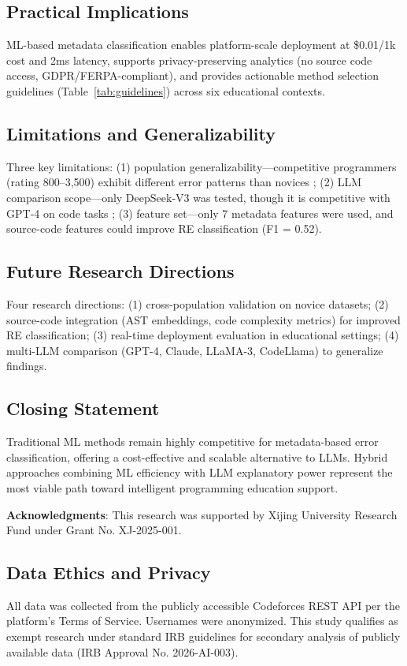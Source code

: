 \documentclass[10pt,a4paper]{article}
\begin{document}
\subsection*{Practical Implications}
ML-based metadata classification enables platform-scale deployment at \$0.01/1k cost and 2ms latency, supports privacy-preserving analytics (no source code access, GDPR/FERPA-compliant), and provides actionable method selection guidelines (Table~\ref{tab:guidelines}) across six educational contexts.

\subsection*{Limitations and Generalizability}
Three key limitations: (1) population generalizability---competitive programmers (rating 800--3,500) exhibit different error patterns than novices \cite{lee2022cs1qa,bey2022analyzing}; (2) LLM comparison scope---only DeepSeek-V3 was tested, though it is competitive with GPT-4 on code tasks \cite{deepseek2024technical}; (3) feature set---only 7 metadata features were used, and source-code features could improve RE classification (F1 = 0.52).

\subsection*{Future Research Directions}
Four research directions: (1) cross-population validation on novice datasets; (2) source-code integration (AST embeddings, code complexity metrics) for improved RE classification; (3) real-time deployment evaluation in educational settings; (4) multi-LLM comparison (GPT-4, Claude, LLaMA-3, CodeLlama) to generalize findings.

\subsection*{Closing Statement}
Traditional ML methods remain highly competitive for metadata-based error classification, offering a cost-effective and scalable alternative to LLMs. Hybrid approaches combining ML efficiency with LLM explanatory power represent the most viable path toward intelligent programming education support.

\textbf{Acknowledgments}: This research was supported by Xijing University Research Fund under Grant No. XJ-2025-001.

\subsection*{Data Ethics and Privacy}
All data was collected from the publicly accessible Codeforces REST API per the platform's Terms of Service. Usernames were anonymized. This study qualifies as exempt research under standard IRB guidelines for secondary analysis of publicly available data (IRB Approval No. 2026-AI-003).
\end{document}
